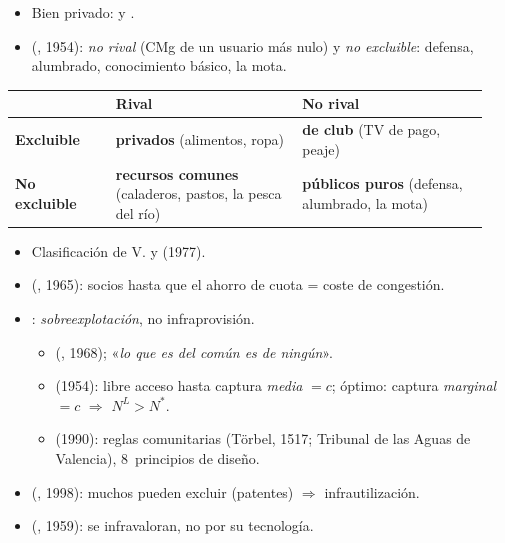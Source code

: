 \documentclass{article}
\begin{document}
\begin{columnas}
\begin{itemize}
\item Bien privado:  y .
\item {} (, 1954): \emph{no rival} (CMg de un usuario más nulo) y \emph{no excluible}: defensa, alumbrado, conocimiento básico, la mota.
\end{itemize}
{\centering\small\renewcommand{\arraystretch}{1.1}\setlength{\tabcolsep}{2.5pt}%
\begin{tabular}{@{}>{\raggedright\arraybackslash}m{0.2\linewidth}>{\raggedright\arraybackslash}m{0.37\linewidth}>{\raggedright\arraybackslash}m{0.37\linewidth}@{}}
\toprule
\rowcolor{tceeazulpalido} & \textbf{Rival} & \textbf{No rival}\\
\midrule
\textbf{Excluible} & \textbf{privados} (alimentos, ropa) & \textbf{de club} (TV de pago, peaje)\\
\textbf{No excluible} & \textbf{recursos comunes} (caladeros, pastos, la pesca del río) & \textbf{públicos puros} (defensa, alumbrado, la mota)\\
\bottomrule
\end{tabular}\par}
\begin{itemize}
\item Clasificación de V. y  (1977).
\item {} (, 1965): socios hasta que el ahorro de cuota = coste de congestión.
\item {}: \emph{sobreexplotación}, no infraprovisión.
  \begin{itemize}
  \item {} (, 1968); «\emph{lo que es del común es de ningún}».
  \item {} (1954): libre acceso hasta captura \emph{media} $=c$; óptimo: captura \emph{marginal} $=c$ $\Rightarrow$ $N^L>N^*$.
  \item {} (1990): reglas comunitarias (Törbel, 1517; Tribunal de las Aguas de Valencia), 8~principios de diseño.
  \end{itemize}
\item {} (, 1998): muchos pueden excluir (patentes) $\Rightarrow$ infrautilización.
\item {} (, 1959): se infravaloran, no por su tecnología.

\end{itemize}
\end{columnas}
\end{document}
